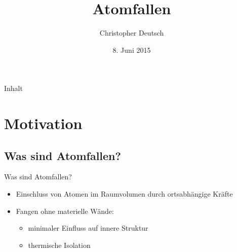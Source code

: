 \documentclass[12pt,xcolor=dvipsnames]{beamer}
\author[Christopher Deutsch]
{Christopher Deutsch}
\title
{Atomfallen}
\subtitle
{}
\institute[]
{Rheinische Friedrich-Wilhelms-Universität Bonn \\
Proseminar Präsentationstechnik SS15}
\date{8. Juni 2015}
\begin{document}
\maketitle

\begin{frame}{Inhalt}
	\tableofcontents
\end{frame}


\section{Motivation}

\subsection{Was sind Atomfallen?}
\begin{frame}{Was sind Atomfallen?}
	\begin{itemize}
		\setlength\itemsep{1em}
		\item Einschluss von Atomen im Raumvolumen durch ortsabhängige Kräfte
		
		\item Fangen ohne materielle Wände:
		\begin{itemize}
			\item minimaler Einfluss auf innere Struktur
			
			\item thermische Isolation
		\end{itemize}

	\end{itemize}
\end{frame}
\end{document}
